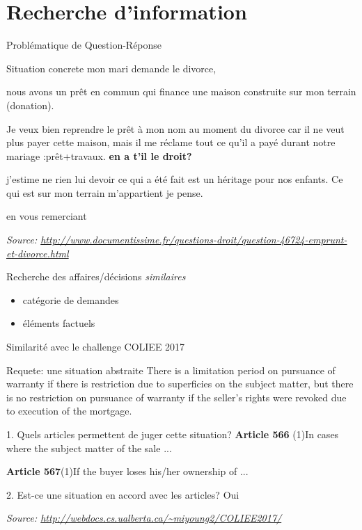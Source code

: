 \documentclass[newPxFont,pagenumber]{beamer}
\begin{document}
\section{Recherche d'information}
\begin{frame}{Problématique de Question-Réponse}
\scriptsize
\begin{alertblock}{Situation concrete}
mon mari demande le divorce, 

nous avons un prêt en commun qui finance une maison construite sur mon terrain (donation).

Je veux bien reprendre le prêt à mon nom au moment du divorce car il ne veut plus payer cette maison, mais il me réclame tout ce qu'il a payé durant notre mariage :prêt+travaux. \textbf{\large en a t'il le droit?}

j'estime ne rien lui devoir ce qui a été fait est un héritage pour nos enfants. Ce qui est sur mon terrain m'appartient je pense.

en vous remerciant

\textit{\tiny Source: \url{http://www.documentissime.fr/questions-droit/question-46724-emprunt-et-divorce.html}}
\end{alertblock}


\begin{block}{Recherche des affaires/décisions \og \textit{similaires} \fg{}}
\begin{itemize}
\item catégorie de demandes
\item éléments factuels
\end{itemize}
\end{block}

\end{frame}
\begin{frame}{Similarité avec le challenge COLIEE 2017}
\scriptsize
\begin{alertblock}{Requete: une situation abstraite}
There is a limitation period on pursuance of warranty if there is restriction due to superficies on the subject matter, but there is no restriction on pursuance of warranty if the seller's rights were revoked due to execution of the mortgage. 
\end{alertblock}

\begin{exampleblock}{1. Quels articles permettent de juger cette situation?}
\textbf{Article 566} (1)In cases where the subject matter of the sale ...

\textbf{Article 567}(1)If the buyer loses his/her ownership of ...
\end{exampleblock}

\begin{exampleblock}{2. Est-ce une situation en accord avec les articles?}
Oui
\end{exampleblock}
\textit{\tiny Source: \url{http://webdocs.cs.ualberta.ca/~miyoung2/COLIEE2017/}}
\end{frame}
\end{document}
